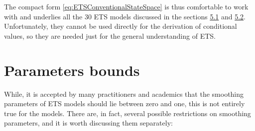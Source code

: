 \documentclass[
]{book}
\theoremstyle{definition}
\theoremstyle{definition}
\theoremstyle{definition}
\theoremstyle{definition}
\theoremstyle{remark}
\begin{document}
The compact form \eqref{eq:ETSConventionalStateSpace} is thus comfortable to work with and underlies all the 30 ETS models discussed in the sections \protect\hyperlink{ETSTaxonomy}{5.1} and \protect\hyperlink{ETSTaxonomyMaths}{5.2}. Unfortunately, they cannot be used directly for the derivation of conditional values, so they are needed just for the general understanding of ETS.

\hypertarget{ETSParametersBounds}{%
\section{Parameters bounds}\label{ETSParametersBounds}}

While, it is accepted by many practitioners and academics that the smoothing parameters of ETS models should lie between zero and one, this is not entirely true for the models. There are, in fact, several possible restrictions on smoothing parameters, and it is worth discussing them separately:
\end{document}
